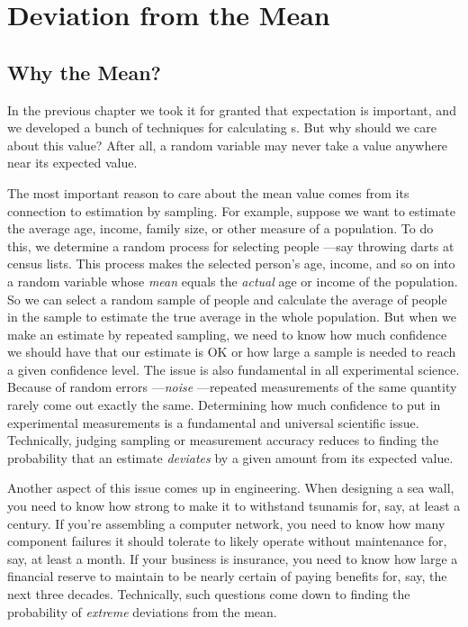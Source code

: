 \chapter{Deviation from the Mean}\label{deviation_chap}

\section{Why the Mean?}

In the previous chapter we took it for granted that expectation is
important, and we developed a bunch of techniques for calculating
s.  But why should we care about this value?
After all, a random variable may never take a value anywhere near its
expected value.

The most important reason to care about the mean value comes from its
connection to estimation by sampling.  For example, suppose we want to
estimate the average age, income, family size, or other measure of a
population.  To do this, we determine a random process for selecting
people ---say throwing darts at census lists.  This process makes the
selected person's age, income, and so on into a random variable whose
\emph{mean} equals the \emph{actual } age or income of
the population.  So we can select a random sample of people and
calculate the average of people in the sample to estimate the true
average in the whole population.  But when we make an estimate by
repeated sampling, we need to know how much confidence we should have
that our estimate is OK or how large a sample is needed to reach a
given confidence level.  The issue is also fundamental in all
experimental science.  Because of random errors ---\emph{noise}
---repeated measurements of the same quantity rarely come out exactly
the same.  Determining how much confidence to put in experimental
measurements is a fundamental and universal scientific issue.  
Technically, judging sampling or measurement accuracy reduces to
finding the probability that an estimate \emph{deviates} by a given
amount from its expected value.

Another aspect of this issue comes up in engineering.  When designing
a sea wall, you need to know how strong to make it to withstand
tsunamis for, say, at least a century.  If you're assembling a
computer network, you need to know how many component failures it
should tolerate to likely operate without maintenance for, say, at
least a month.  If your business is insurance, you need to know how
large a financial reserve to maintain to be nearly certain of paying
benefits for, say, the next three decades.  Technically, such
questions come down to finding the probability of \emph{extreme}
deviations from the mean.

